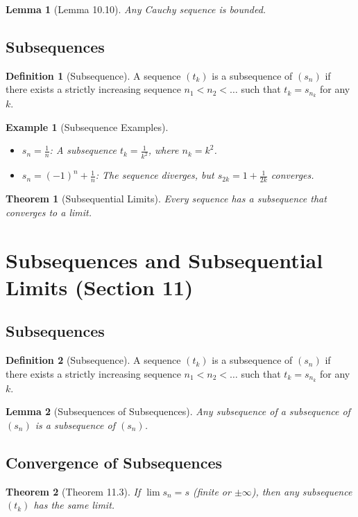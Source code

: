 \documentclass[9pt]{article}
\theoremstyle{definition}
\newtheorem{definition}{Definition}
\theoremstyle{plain}
\newtheorem{theorem}{Theorem}
\newtheorem{example}{Example}
\newtheorem{lemma}{Lemma}
\begin{document}
\begin{lemma}[Lemma 10.10]
Any Cauchy sequence is bounded.
\end{lemma}

\subsection*{Subsequences}
\begin{definition}[Subsequence]
A sequence \( (t_k) \) is a subsequence of \( (s_n) \) if there exists a strictly increasing sequence \( n_1 < n_2 < \ldots \) such that \( t_k = s_{n_k} \) for any \( k \).
\end{definition}

\begin{example}[Subsequence Examples]
\leavevmode
\begin{itemize}
    \item \( s_n = \frac{1}{n} \): A subsequence \( t_k = \frac{1}{k^2} \), where \( n_k = k^2 \).
    \item \( s_n = (-1)^n + \frac{1}{n} \): The sequence diverges, but \( s_{2k} = 1 + \frac{1}{2k} \) converges.
\end{itemize}
\end{example}

\begin{theorem}[Subsequential Limits]
Every sequence has a subsequence that converges to a limit.
\end{theorem}
\section*{Subsequences and Subsequential Limits (Section 11)}

\subsection*{Subsequences}
\begin{definition}[Subsequence]
A sequence \( (t_k) \) is a subsequence of \( (s_n) \) if there exists a strictly increasing sequence \( n_1 < n_2 < \ldots \) such that \( t_k = s_{n_k} \) for any \( k \).
\end{definition}

\begin{lemma}[Subsequences of Subsequences]
Any subsequence of a subsequence of \( (s_n) \) is a subsequence of \( (s_n) \).
\end{lemma}

\subsection*{Convergence of Subsequences}
\begin{theorem}[Theorem 11.3]
If \( \lim s_n = s \) (finite or \( \pm\infty \)), then any subsequence \( (t_k) \) has the same limit.
\end{theorem}
\end{document}

